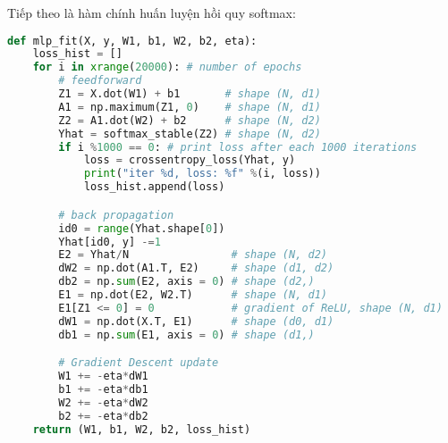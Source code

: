 Tiếp theo là hàm chính huấn luyện hồi quy softmax:
\begin{lstlisting}[language=Python]
def mlp_fit(X, y, W1, b1, W2, b2, eta):
    loss_hist = []
    for i in xrange(20000): # number of epochs 
        # feedforward 
        Z1 = X.dot(W1) + b1       # shape (N, d1)
        A1 = np.maximum(Z1, 0)    # shape (N, d1)
        Z2 = A1.dot(W2) + b2      # shape (N, d2)
        Yhat = softmax_stable(Z2) # shape (N, d2)
        if i %1000 == 0: # print loss after each 1000 iterations
            loss = crossentropy_loss(Yhat, y)
            print("iter %d, loss: %f" %(i, loss))
            loss_hist.append(loss)

        # back propagation
        id0 = range(Yhat.shape[0])
        Yhat[id0, y] -=1 
        E2 = Yhat/N                # shape (N, d2)
        dW2 = np.dot(A1.T, E2)     # shape (d1, d2)
        db2 = np.sum(E2, axis = 0) # shape (d2,)
        E1 = np.dot(E2, W2.T)      # shape (N, d1)
        E1[Z1 <= 0] = 0            # gradient of ReLU, shape (N, d1)
        dW1 = np.dot(X.T, E1)      # shape (d0, d1)
        db1 = np.sum(E1, axis = 0) # shape (d1,)

        # Gradient Descent update
        W1 += -eta*dW1
        b1 += -eta*db1
        W2 += -eta*dW2
        b2 += -eta*db2
    return (W1, b1, W2, b2, loss_hist)
\end{lstlisting}
 

